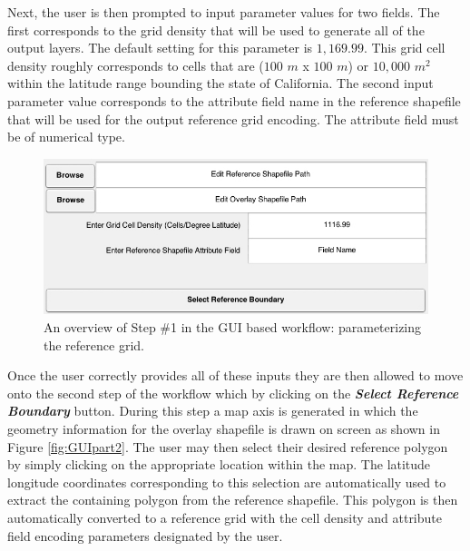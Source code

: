 Next, the user is then prompted to input parameter values for two fields. The first corresponds to the grid density that will be used to generate all of the output layers. The default setting for this parameter is $1,169.99$. This grid cell density roughly corresponds to cells that are ($100$ $m$ x $100$ $m$) or $10,000$ $m^2$  within the latitude range bounding the state of California. The second input parameter value corresponds to the attribute field name in the reference shapefile that will be used for the output reference grid encoding. The attribute field must be of numerical type. 

         \begin{figure}[!h]
            \includegraphics[width=5.5in]{figures/gui_fig1.jpg}
            \caption{An overview of Step \#1 in the GUI based workflow: parameterizing the reference grid.}
            \label{fig:GUIpart1}
        \end{figure}

Once the user correctly provides all of these inputs they are then allowed to move onto the second step of the workflow which by clicking on the \textit{\textbf{Select Reference Boundary}} button. During this step a map axis is generated in which the geometry information for the overlay shapefile is drawn on screen as shown in Figure \ref{fig:GUIpart2}. The user may then select their desired reference polygon by simply clicking on the appropriate location within the map. The latitude longitude coordinates corresponding to this selection are automatically used to extract the containing polygon from the reference shapefile. This polygon is then automatically converted to a reference grid with the cell density and attribute field encoding parameters designated by the user.

